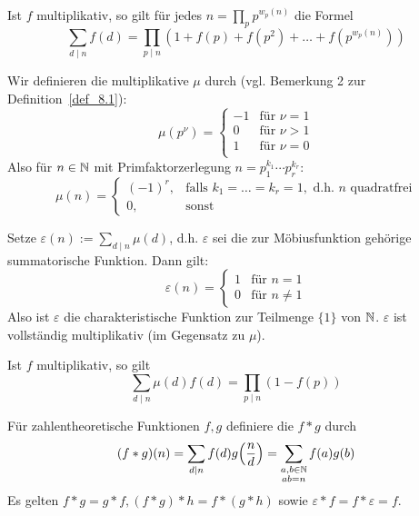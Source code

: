 \begin{falko} \label{F8.2}
	Ist $f$ multiplikativ, so gilt für jedes $n = \prod_p p^{w_p(n)}$ die Formel
	\[ \sum\limits_{d \mid n} f(d) = \prod\limits_{p \mid n} (1+f(p) + f(p^2) + \dots + f(p^{w_p(n)})) \]
\end{falko}

\begin{defn}[Möbiusfunktion] \label{def_8.2}
	Wir definieren die multiplikative  $\mu$ durch (vgl. Bemerkung 2 zur Definition~\ref{def_8.1}):
	\[ \mu(p^\nu) = \begin{cases}
		-1 & \text{für } \nu = 1 \\
		0 & \text{für } \nu > 1 \\
		1 & \text{für } \nu = 0 \\
	\end{cases} \]
	Also für $n \in \mathbb{N}$ mit Primfaktorzerlegung $n = p_1^{k_1} \cdots p_r^{k_r}$:
	\[ \mu(n) = \begin{cases}
		(-1)^r, & \text{falls } k_1 = \dots = k_r = 1, \text{ d.h. } n \text{ quadratfrei} \\
		0, & \text{sonst}
	\end{cases} \]
\end{defn}

\begin{falko} \label{F8.3}
	Setze $\varepsilon(n) := \sum\limits_{d \mid n} \mu(d)$, d.h. $\varepsilon$ sei die zur Möbiusfunktion gehörige summatorische Funktion. Dann gilt:
	\[ \varepsilon(n) = \begin{cases}
		1 & \text{für } n=1 \\
		0 & \text{für } n \neq 1
	\end{cases} \]
	Also ist $\varepsilon$ die charakteristische Funktion zur Teilmenge $\{1\}$ von $\mathbb{N}$. $\varepsilon$ ist vollständig multiplikativ (im Gegensatz zu $\mu$).
\end{falko}

\begin{falko} \label{F8.4}
	Ist $f$ multiplikativ, so gilt
	\[ \sum\limits_{d \mid n} \mu(d) f(d) = \prod\limits_{p \mid n} (1-f(p)) \]
\end{falko}

\begin{defn} \label{def_8.3}
	Für zahlentheoretische Funktionen $f,g$ definiere die  $f * g$ durch
	\[ (f * g)(n) = \sum\limits_{d \mid n} f(d) g\enbrace*{\frac{n}{d}} = \sum\limits_{\substack{a,b \in \NN \\ ab = n}} f(a) g(b) \]
	Es gelten $f * g = g*f, (f*g)*h = f*(g*h)$ sowie $\varepsilon*f = f*\varepsilon = f$.
\end{defn}

